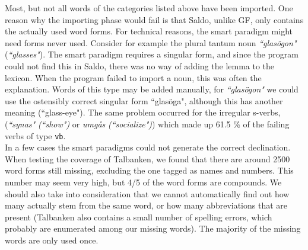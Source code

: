 \documentclass{report}
\begin{document}
%
Most, but not all words of the categories listed above have been imported.
One reason why the importing phase would fail 
is that Saldo, unlike GF, only contains the actually used word forms.
For technical reasons, the smart paradigm might need forms never used.
Consider for example
the plural tantum %
noun \emph{``glasögon"} (\emph{``glasses"}).
The smart paradigm requires a singular form, and since the program could not
find this in Saldo, there was no way of adding the lemma to the lexicon. 
When the program failed to import a noun, this was often the explanation.
Words of this type may be added manually, for \emph{``glasögon"} we could use
the ostensibly correct singular form ``glasöga", although this
has another meaning (``glass-eye").
The same problem occurred for the irregular s-verbs,
(\emph{``synas"} \emph{(``show")} or \emph{umgås} \emph{(``socialize")})
which made up 61.5 \% of the failing verbs of type \verb_vb_.\\
In a few cases the smart paradigms could not generate the correct declination.\\


When testing the coverage of Talbanken,
we found that there are around 2500 word forms still missing, excluding the one
tagged as names and numbers. This number may seem very high, but %
4/5 of the word forms are compounds. We should also take into consideration that 
we cannot automatically find out how many actually stem from the same word, or
how many abbreviations that are present (Talbanken also contains a small number of 
spelling errors, which probably are enumerated among our missing words). The majority
of the missing words are only used once.\\
\end{document}
